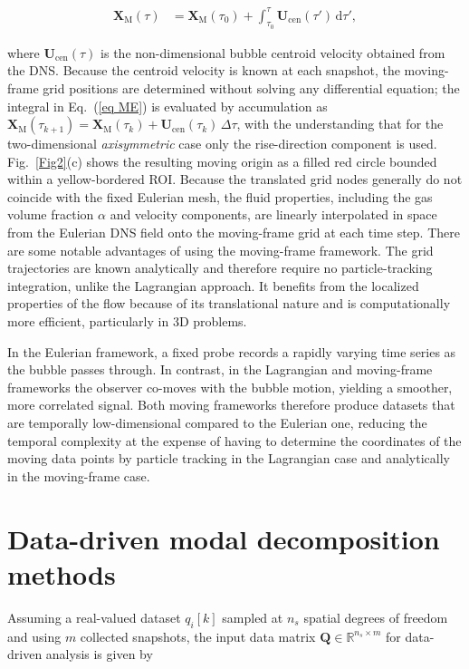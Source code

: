 \documentclass[a4paper,fleqn]{cas-sc}
\begin{document}
	\begin{align}
		\mathbf{X}_{\mathrm{M}}(\tau) &= \mathbf{X}_{\mathrm{M}}(\tau_0) + \int_{\tau_0}^{\tau} \mathbf{U}_{\mathrm{cen}}(\tau')\,\mathrm{d}\tau',
		\label{eq ME}
	\end{align}
	
	\noindent where $\mathbf{U}_{\mathrm{cen}}(\tau)$ is the non-dimensional bubble centroid velocity obtained from the DNS. Because the centroid velocity is known at each snapshot, the moving-frame grid positions are determined without solving any differential equation; the integral in Eq.~(\ref{eq ME}) is evaluated by accumulation as $\mathbf{X}_{\mathrm{M}}(\tau_{k+1}) = \mathbf{X}_{\mathrm{M}}(\tau_k) + \mathbf{U}_{\mathrm{cen}}(\tau_k)\,\Delta\tau$, with the understanding that for the two-dimensional \textit{axisymmetric} case only the rise-direction component is used. Fig.~\ref{Fig2}(c) shows the resulting moving origin as a filled red circle bounded within a yellow-bordered ROI. Because the translated grid nodes generally do not coincide with the fixed Eulerian mesh, the fluid properties, including the gas volume fraction $\alpha$ and velocity components, are linearly interpolated in space from the Eulerian DNS field onto the moving-frame grid at each time step. There are some notable advantages of using the moving-frame framework. The grid trajectories are known analytically and therefore require no particle-tracking integration, unlike the Lagrangian approach. It benefits from the localized properties of the flow because of its translational nature and is computationally more efficient, particularly in 3D problems.
	
	In the Eulerian framework, a fixed probe records a rapidly varying time series as the bubble passes through. In contrast, in the Lagrangian and moving-frame frameworks the observer co-moves with the bubble motion, yielding a smoother, more correlated signal. Both moving frameworks therefore produce datasets that are temporally low-dimensional compared to the Eulerian one, reducing the temporal complexity at the expense of having to determine the coordinates of the moving data points by particle tracking in the Lagrangian case and analytically in the moving-frame case.
	
	\section{Data-driven modal decomposition methods}
	\label{Data-driven methods}
	
	Assuming a real-valued dataset $q_i[k]$ sampled at $n_s$ spatial degrees of freedom and using $m$ collected snapshots, the input data matrix $\mathbf{Q}\in \mathbb{R}^{n_s\times m}$ for data-driven analysis is given by
	
\end{document}
